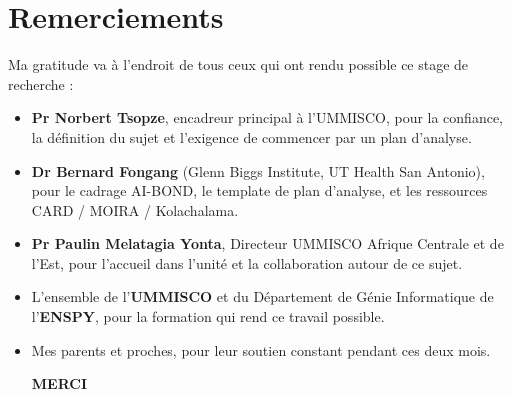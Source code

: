 \chapter*{Remerciements}
\begin{SingleSpace}

Ma gratitude va à l'endroit de tous ceux qui ont rendu possible ce stage de recherche :

\begin{itemize}

    \item \textbf{Pr Norbert Tsopze}, encadreur principal à l'UMMISCO, pour la confiance, la définition du sujet et l'exigence de commencer par un plan d'analyse.

    \vspace{0.3cm}

    \item \textbf{Dr Bernard Fongang} (Glenn Biggs Institute, UT Health San Antonio), pour le cadrage AI-BOND, le template de plan d'analyse, et les ressources CARD / MOIRA / Kolachalama.

    \vspace{0.3cm}

    \item \textbf{Pr Paulin Melatagia Yonta}, Directeur UMMISCO Afrique Centrale et de l'Est, pour l'accueil dans l'unité et la collaboration autour de ce sujet.

    \vspace{0.3cm}

    \item L'ensemble de l'\textbf{UMMISCO} et du Département de Génie Informatique de l'\textbf{ENSPY}, pour la formation qui rend ce travail possible.

    \vspace{0.3cm}

    \item Mes parents et proches, pour leur soutien constant pendant ces deux mois.

\vspace{0.5cm}

\textbf{MERCI}

\end{itemize}

\end{SingleSpace}
\clearpage
